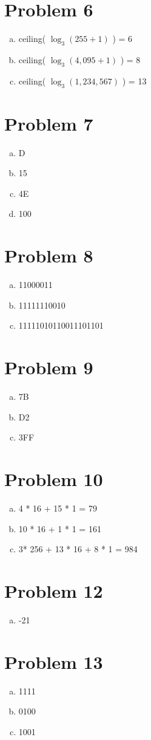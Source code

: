 \documentclass[11pt]{article}
\begin{document}
\section*{Problem 6}
\begin{enumerate}[(a)]
	\item ceiling( $\log _3 (255+1)$ ) = 6
	\item ceiling( $\log _3 (4,095+1)$ ) = 8
	\item ceiling( $\log _3 (1,234,567)$ ) = 13
\end{enumerate}

\section*{Problem 7}
\begin{enumerate}[(a)]
	\item D
	\item 15
	\item 4E
	\item 100
\end{enumerate}

\section*{Problem 8}
\begin{enumerate}[(a)]
	\item 11000011
	\item 11111110010
	\item 11111010110011101101
\end{enumerate}

\section*{Problem 9}
\begin{enumerate}[(a)]
	\item 7B
	\item D2
	\item 3FF
\end{enumerate}

\section*{Problem 10}
\begin{enumerate}[(a)]
	\item 4 * 16 + 15 * 1 = 79
	\item 10 * 16 + 1 * 1 = 161
	\item 3* 256 + 13 * 16 + 8 * 1 = 984
\end{enumerate}

\section*{Problem 12}
\begin{enumerate}[(a)]
	\item -21
\end{enumerate}

\section*{Problem 13}
\begin{enumerate}[(a)]
	\item 1111
	\item 0100
	\item 1001
\end{enumerate}
\end{document}
